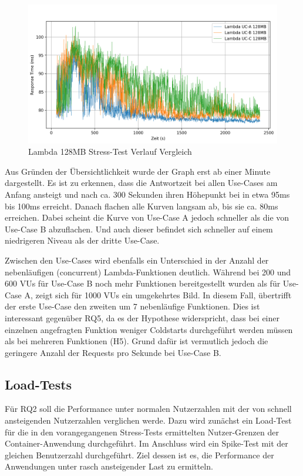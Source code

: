 \begin{figure}[H]
    \includegraphics[width=\textwidth]{img/lambda128-stress1000-comparison-graph.png}
    \caption[Lambda 128MB Stress-Test Verlauf Vergleich]{Lambda 128MB Stress-Test Verlauf Vergleich}
    \label{fig:lambda128-stress1000-comparison-graph}
\end{figure}

Aus Gründen der Übersichtlichkeit wurde der Graph erst ab einer Minute dargestellt. Es ist zu erkennen, dass die Antwortzeit bei allen Use-Cases am Anfang ansteigt und nach ca. 300 Sekunden ihren Höhepunkt bei in etwa 95ms bis 100ms erreicht. Danach flachen alle Kurven langsam ab, bis sie ca. 80ms erreichen. Dabei scheint die Kurve von Use-Case A jedoch schneller als die von Use-Case B abzuflachen. Und auch dieser befindet sich schneller auf einem niedrigeren Niveau als der dritte Use-Case.

Zwischen den Use-Cases wird ebenfalls ein Unterschied in der Anzahl der nebenläufigen (concurrent) Lambda-Funktionen deutlich. Während bei 200 und 600 VUs für Use-Case B noch mehr Funktionen bereitgestellt wurden als für Use-Case A, zeigt sich für 1000 VUs ein umgekehrtes Bild. In diesem Fall, übertrifft der erste Use-Case den zweiten um 7 nebenläufige Funktionen. Dies ist interessant gegenüber RQ5, da es der Hypothese widerspricht, dass bei einer einzelnen angefragten Funktion weniger Coldstarts durchgeführt werden müssen als bei mehreren Funktionen (H5). Grund dafür ist vermutlich jedoch die geringere Anzahl der Requests pro Sekunde bei Use-Case B. 

\subsection{Load-Tests}
Für RQ2 soll die Performance unter normalen Nutzerzahlen mit der von schnell ansteigenden Nutzerzahlen verglichen werde. Dazu wird zunächst ein Load-Test für die in den vorangegangenen Stress-Tests ermittelten Nutzer-Grenzen der Container-Anwendung durchgeführt. Im Anschluss wird ein Spike-Test mit der gleichen Benutzerzahl durchgeführt. Ziel dessen ist es, die Performance der Anwendungen unter rasch ansteigender Last zu ermitteln. 

